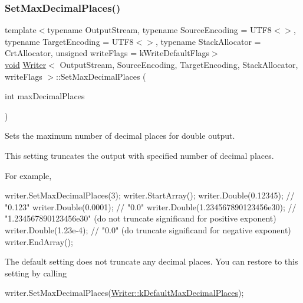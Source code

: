\subsubsection{\texorpdfstring{Set\+Max\+Decimal\+Places()}{SetMaxDecimalPlaces()}}
{\footnotesize\ttfamily template$<$typename Output\+Stream, typename Source\+Encoding = U\+T\+F8$<$$>$, typename Target\+Encoding = U\+T\+F8$<$$>$, typename Stack\+Allocator = Crt\+Allocator, unsigned write\+Flags = k\+Write\+Default\+Flags$>$ \\
\hyperlink{imgui__impl__opengl3__loader_8h_ac668e7cffd9e2e9cfee428b9b2f34fa7}{void} \hyperlink{classWriter}{Writer}$<$ Output\+Stream, Source\+Encoding, Target\+Encoding, Stack\+Allocator, write\+Flags $>$\+::Set\+Max\+Decimal\+Places (\begin{DoxyParamCaption}\item[{int}]{max\+Decimal\+Places }\end{DoxyParamCaption})\hspace{0.3cm}{\ttfamily [inline]}}



Sets the maximum number of decimal places for double output. 

This setting truncates the output with specified number of decimal places.

For example,


\begin{DoxyCode}
writer.SetMaxDecimalPlaces(3);
writer.StartArray();
writer.Double(0.12345);                 \textcolor{comment}{// "0.123"}
writer.Double(0.0001);                  \textcolor{comment}{// "0.0"}
writer.Double(1.234567890123456e30);    \textcolor{comment}{// "1.234567890123456e30" (do not truncate significand for positive
       exponent)}
writer.Double(1.23e-4);                 \textcolor{comment}{// "0.0"                  (do truncate significand for negative
       exponent)}
writer.EndArray();
\end{DoxyCode}


The default setting does not truncate any decimal places. You can restore to this setting by calling 
\begin{DoxyCode}
writer.SetMaxDecimalPlaces(\hyperlink{classWriter_ab46d66ae0ca78cb03ab7fb865d129934}{Writer::kDefaultMaxDecimalPlaces});
\end{DoxyCode}
 \mbox{\label{classWriter_a38715785194b42cd67ba5dd52bf7967e}} 
